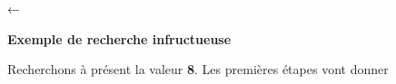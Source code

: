 		\bigskip


		\textstyleWWPolicepardfaut{
		}\textstyleWWPolicepardfaut{
		}\textsf{←}\textstyleWWPolicepardfaut{ }

	{\sffamily\bfseries\upshape
	Exemple de recherche infructueuse}

		Recherchons à présent la valeur {\textbf{8}}. Les premières étapes vont donner
		
		
		\begin{center}
		\tablehead{}
		\begin{supertabular}
			{m{0.49700004cm}m{0.49700004cm}m{0.49700004cm}m{0.49700004cm}m{0.49700004cm}
			m{0.49700004cm}m{0.49700004cm}m{0.49700004cm}m{0.49700004cm}m{0.49700004cm}
			m{0.49700004cm}m{0.49700004cm}m{0.49700004cm}m{0.49700004cm}m{0.49700004cm}
			m{0.49700004cm}m{0.49700004cm}m{0.48300004cm}m{0.48300004cm}m{0.53000003cm}}
			

\end{supertabular}
\end{center}
